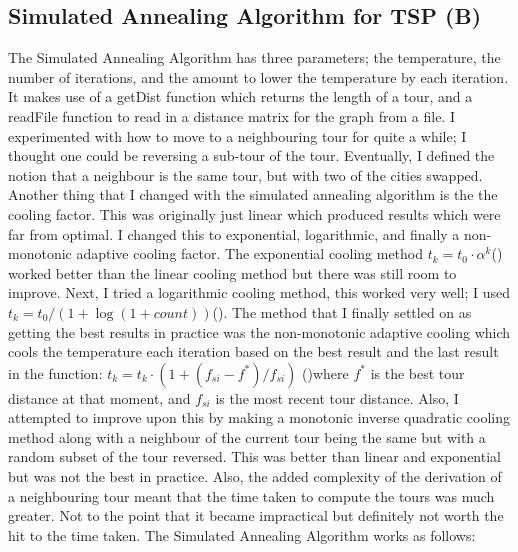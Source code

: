 \documentclass{article}
\begin{document}
\subsection{Simulated Annealing Algorithm for TSP (B)}
The Simulated Annealing Algorithm has three parameters; the temperature, the number of iterations, and the amount to lower the temperature by each iteration. It makes use of a getDist function which returns the length of a tour, and a readFile function to read in a distance matrix for the graph from a file. I experimented with how to move to a neighbouring tour for quite a while; I thought one could be reversing a sub-tour of the tour. Eventually, I defined the notion that a neighbour is the same tour, but with two of the cities swapped. Another thing that I changed with the simulated annealing algorithm is the the cooling factor. This was originally just linear which produced results which were far from optimal. I changed this to exponential, logarithmic, and finally a non-monotonic adaptive cooling factor. The exponential cooling method $t_k= t_0 \cdot \alpha^k$(\cite{cooling}) worked better than the linear cooling method but there was still room to improve. Next, I tried a logarithmic cooling method, this worked very well; I used $t_k= t_0/(1+\log(1+count))$(\cite{cooling}). The method that I finally settled on as getting the best results in practice was the non-monotonic adaptive cooling which cools the temperature each iteration based on the best result and the last result in the function: $t_k = t_k \cdot (1+(f_{si}-f^*)/f_{si})$ (\cite{cooling})where $f^*$ is the best tour distance at that moment, and $f_{si}$ is the most recent tour distance. Also, I attempted to improve upon this by making a monotonic inverse quadratic cooling method along with a neighbour of the current tour being the same but with a random subset of the tour reversed. This was better than linear and exponential but was not the best in practice. Also, the added complexity of the derivation of a neighbouring tour meant that the time taken to compute the tours was much greater. Not to the point that it became impractical but definitely not worth the hit to the time taken.
The Simulated Annealing Algorithm works as follows:
\end{document}
